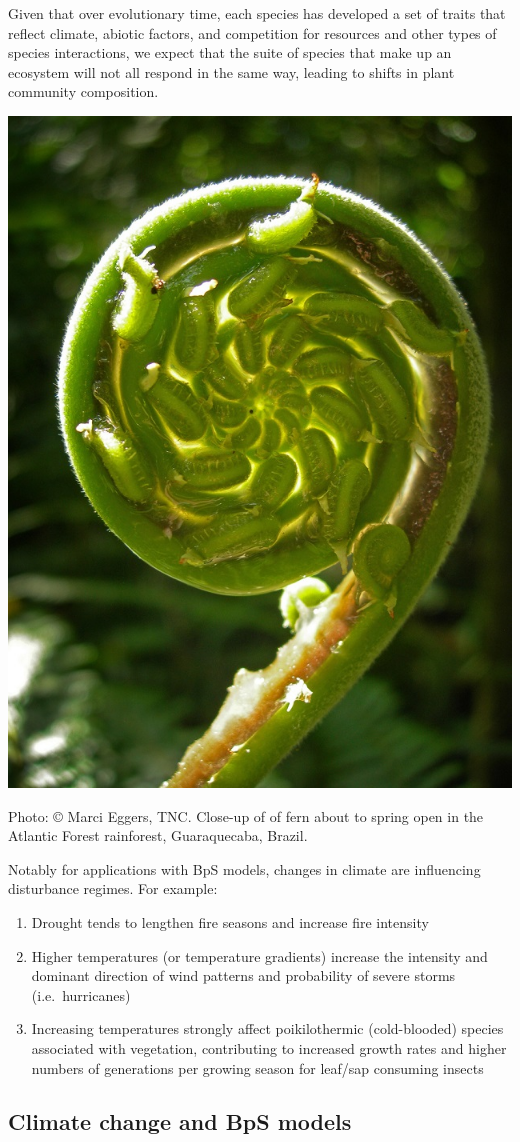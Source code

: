 \documentclass[
]{article}
\begin{document}
Given that over evolutionary time, each species has developed a set of
traits that reflect climate, abiotic factors, and competition for
resources and other types of species interactions, we expect that the
suite of species that make up an ecosystem will not all respond in the
same way, leading to shifts in plant community composition.

\includegraphics[width=0.45\linewidth]{images/fern}

Photo: © Marci Eggers, TNC. Close-up of of fern about to spring open in
the Atlantic Forest rainforest, Guaraquecaba, Brazil.

\begin{blue}

Notably for applications with BpS models, changes in climate are
influencing disturbance regimes. For example:

\begin{enumerate}
\def\labelenumi{\arabic{enumi}.}
\item
  Drought tends to lengthen fire seasons and increase fire intensity
\item
  Higher temperatures (or temperature gradients) increase the intensity
  and dominant direction of wind patterns and probability of severe
  storms (i.e.~hurricanes)
\item
  Increasing temperatures strongly affect poikilothermic (cold-blooded)
  species associated with vegetation, contributing to increased growth
  rates and higher numbers of generations per growing season for
  leaf/sap consuming insects
\end{enumerate}

\end{blue}

\hypertarget{climate-change-and-bps-models}{%
\subsection{Climate change and BpS
models}\label{climate-change-and-bps-models}}
\end{document}
